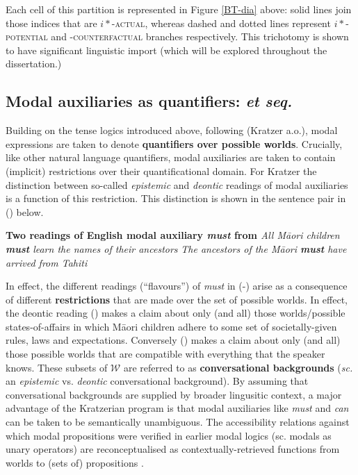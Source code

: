 \documentclass[11pt,dvipsnames]{report}
\begin{document}
\xe

 Each cell of this partition is represented in Figure \ref{BT-dia} above: solid lines join those indices that are \textsc{$ i* $-actual}, whereas dashed and dotted lines represent \textsc{$ i* $-potential} and \textsc{-counterfactual} branches respectively. This trichotomy is shown to have significant linguistic import (which will be explored throughout the dissertation.)

\subsection[Modal auxiliaries as quantifiers]{Modal auxiliaries as quantifiers: \citealt{Kratzer1977} \textit{et seq.}}\label{sec:kratzer}
 Building on the tense logics introduced above, following (Kratzer \citeyear{Kratzer1977,Kratzer1981,Kratzer1991} a.o.), modal expressions are taken to denote \textbf{quantifiers over possible worlds}. Crucially, like other natural language quantifiers, modal auxiliaries are taken to contain (implicit) restrictions over their quantificational domain. For Kratzer the distinction between so-called \textit{epistemic} and \textit{deontic} readings of modal auxiliaries is a function of this restriction. This distinction is shown in the sentence pair in () below.

\pex \textbf{Two readings of English modal auxiliary \textit{must} from \citet[338]{Kratzer1977}}
\a\textit{All Māori children \textbf{must} learn the names of their ancestors}
\a\textit{The ancestors of the Māori \textbf{must} have arrived from Tahiti}
\xe

In effect, the different readings (``flavours'') of \textit{must} in (-) arise as a consequence of different \textbf{restrictions} that are made over the set of possible worlds. In effect, the deontic reading () makes a claim about only (and all) those worlds/possible states-of-affairs in which Māori children adhere to some set of societally-given rules, laws and expectations. Conversely () makes a claim about only (and all) those possible worlds that are compatible with everything that the speaker knows. These subsets of $ \mathcal W$ are referred to as \textbf{conversational backgrounds} (\textit{sc.} an \textit{epistemic} vs. \textit{deontic} conversational background). By assuming that conversational backgrounds are supplied by broader lingusitic context, a major advantage of the Kratzerian program is that modal auxiliaries like \textit{must} and \textit{can} can be taken to be semantically unambiguous. The accessibility relations against which modal propositions were verified in earlier modal logics (sc. modals as unary operators) are reconceptualised as contextually-retrieved functions from worlds to (sets of) propositions \citep*[see][]{Kaufmann2006}. 
\end{document}
